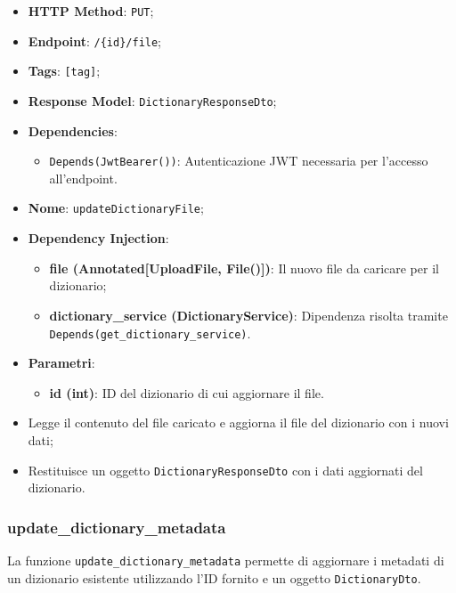 \begin{itemize}
\item \textbf{HTTP Method}: \texttt{PUT};
\item \textbf{Endpoint}: \texttt{/\{id\}/file};
\item \textbf{Tags}: \texttt{[tag]};
\item \textbf{Response Model}: \texttt{DictionaryResponseDto};
\item \textbf{Dependencies}:
\begin{itemize}
\item \texttt{Depends(JwtBearer())}: Autenticazione JWT necessaria per l'accesso all'endpoint.
\end{itemize}
\item \textbf{Nome}: \texttt{updateDictionaryFile};
\item \textbf{Dependency Injection}:
\begin{itemize}
\item \textbf{file (Annotated[UploadFile, File()])}: Il nuovo file da caricare per il dizionario;
\item \textbf{dictionary\_service (DictionaryService)}: Dipendenza risolta tramite \texttt{Depends(get\_dictionary\_service)}.
\end{itemize}
\item \textbf{Parametri}:
\begin{itemize}
\item \textbf{id (int)}: ID del dizionario di cui aggiornare il file.
\end{itemize}
\end{itemize}

\begin{itemize}
\item Legge il contenuto del file caricato e aggiorna il file del dizionario con i nuovi dati;
\item Restituisce un oggetto \texttt{DictionaryResponseDto} con i dati aggiornati del dizionario.
\end{itemize}

\subsubsection{update\_dictionary\_metadata}

\par La funzione \texttt{update\_dictionary\_metadata} permette di aggiornare i metadati di un dizionario esistente utilizzando l'ID fornito e un oggetto \texttt{DictionaryDto}.

